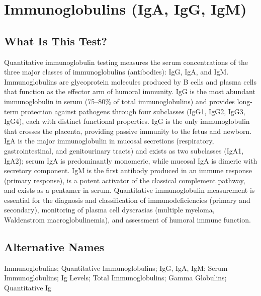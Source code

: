 \chapter{Immunoglobulins (IgA, IgG, IgM)}

\section*{What Is This Test?}
Quantitative immunoglobulin testing measures the serum concentrations of the three major classes of immunoglobulins (antibodies): IgG, IgA, and IgM. Immunoglobulins are glycoprotein molecules produced by B cells and plasma cells that function as the effector arm of humoral immunity. IgG is the most abundant immunoglobulin in serum (75--80\% of total immunoglobulins) and provides long-term protection against pathogens through four subclasses (IgG1, IgG2, IgG3, IgG4), each with distinct functional properties. IgG is the only immunoglobulin that crosses the placenta, providing passive immunity to the fetus and newborn. IgA is the major immunoglobulin in mucosal secretions (respiratory, gastrointestinal, and genitourinary tracts) and exists as two subclasses (IgA1, IgA2); serum IgA is predominantly monomeric, while mucosal IgA is dimeric with secretory component. IgM is the first antibody produced in an immune response (primary response), is a potent activator of the classical complement pathway, and exists as a pentamer in serum. Quantitative immunoglobulin measurement is essential for the diagnosis and classification of immunodeficiencies (primary and secondary), monitoring of plasma cell dyscrasias (multiple myeloma, Waldenstrom macroglobulinemia), and assessment of humoral immune function.

\section*{Alternative Names}
Immunoglobulins; Quantitative Immunoglobulins; IgG, IgA, IgM; Serum Immunoglobulins; Ig Levels; Total Immunoglobulins; Gamma Globulins; Quantitative Ig

